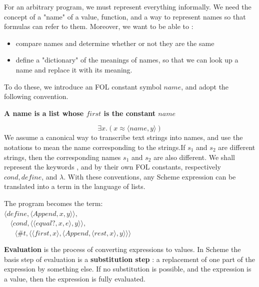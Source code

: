 \documentclass[english, 11pt]{article}
\begin{document}
  For an arbitrary program, we must represent everything informally. We need the concept of a "name" of a value, function, and a way to represent names so that formulas can refer to them. Moreover, we want to be able to :
  \begin{itemize}
    \item compare names and determine whether or not they are the same
    \item define a "dictionary" of the meanings of names, so that we can look up a name and replace it with its meaning.
  \end{itemize}

  To do these, we introduce an FOL constant symbol $name$, and adopt the following convention.
  \begin{center}
    \textbf{A name is a list whose $first$ is the constant $name$}
  \end{center}
  \[ \exists x. (x \approx \langle name, y\rangle) \]
  We assume a canonical way to transcribe text strings into names, and use the notations to mean the name corresponding to the strings.If $s_1$ and $s_2$ are different strings, then the corresponding names $s_1$ and $s_2$ are also different. We shall represent the keywords , and  by their own FOL constants, respectively $cond, define$, and $\lambda$. With these conventions, any Scheme expression can be translated into a term in the language of lists.

  \begin{exmp}
    The program  becomes the term: \\
    $\langle define, \langle Append, x, y\rangle \rangle,$ \\
    $ \ \ \ \ \langle cond, \langle \langle equal?, x, e \rangle, y \rangle \rangle,$ \\
    $ \ \ \ \ \ \ \ \langle \# t, \langle \langle first, x \rangle, \langle Append, \langle rest, x \rangle, y \rangle \rangle \rangle$
  \end{exmp}

  \begin{defn}[evaluation]\label{evaluation}
  \textbf{Evaluation} is the process of converting expressions to values. In Scheme the basis step of evaluation is a \textbf{substitution step} : a replacement of one part of the expression by something else. If no substitution is possible, and the expression is a value, then the expression is fully evaluated.
  \end{defn}
\end{document}
